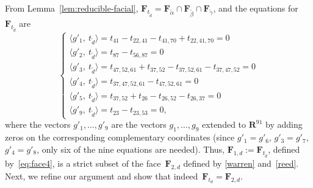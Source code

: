 \documentclass[aos,noinfoline]{imsart}
\def\R{{\mathbf R}}
\def\<{\langle}
\def\>{\rangle}
\newcommand{\Fbf}{\mathbf{F}}
\theoremstyle{remark}
\theoremstyle{definition}
\begin{document}
From Lemma~\ref{lem:reducible-facial},  $\Fbf_{t_{\tilde{d}}}=\Fbf_{\tilde{\alpha}} \cap 
\Fbf_{\tilde{\beta}} \cap \Fbf_{\tilde{\gamma}}$, and the equations for $\Fbf_{t_{\tilde{d}}}$ are
\begin{equation} 
  \label{eq:face4}
  \begin{cases}
    \<g'_1,\  t_{\tilde{d}} \> =t_{41}-t_{22,41}-t_{41,70}+t_{22,41,70}=0 \\
    \<g'_2,\  t_{\tilde{d}} \> =t_{87}-t_{56,87}=0 \\
    \<g'_3,\  t_{\tilde{d}} \> = t_{47,52,61}+t_{37,52}-t_{37,52,61}-t_{37,47,52}=0\\
    \<g'_4,\  t_{\tilde{d}} \> =t_{37, 47 ,52,61}-t_{ 47 ,52,61}=0  \\
    \<g'_5,\  t_{\tilde{d}} \> =t_{37,52}+t_{26}-t_{26,52}-t_{26,37}=0 \\
    \<g'_9,\  t_{\tilde{d}} \> =t_{23}-t_{23,53}=0,
  \end{cases}
\end{equation}
where the vectors $g'_1,\dots,g'_9$ are the vectors $g_{1},\dots,g_{9}$ extended to $\R^{91}$ by adding zeros on the
corresponding complementary coordinates (since $g'_1=g'_6$, $g'_3=g'_7$, $g'_4=g'_8$, only six of the
nine equations are needed).  Thus, $\Fbf_{1,d}:=\Fbf_{t_{\tilde d}}$, defined by~\eqref{eq:face4}, is a strict subset of the face~$\Fbf_{2, d}$ defined by \eqref{warren} and~\eqref{reed}.  Next, we %
refine our argument and show that indeed~$\Fbf_{t_{d}}=\Fbf_{2, d}$.
\end{document}
